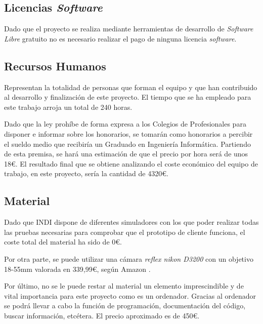 \subsection{Licencias \textit{Software}}
Dado que el proyecto se realiza mediante herramientas de desarrollo de \textit{Software Libre} gratuito no es necesario realizar el pago de ninguna licencia \textit{software}.

\subsection{Recursos Humanos}
Representan la totalidad de personas que forman el equipo y que han contribuido al desarrollo y finalización de este proyecto. El tiempo que se ha empleado para este trabajo arroja un total de 240 horas.

Dado que la ley prohíbe de forma expresa a los Colegios de Profesionales para disponer e informar sobre los honorarios, se tomarán como honorarios a percibir el sueldo medio que recibiría un Graduado en Ingeniería Informática. Partiendo de esta premisa, se hará una estimación de que el precio por hora será de unos 18\euro. El resultado final que se obtiene analizando el coste económico del equipo de trabajo, en este proyecto, sería la cantidad de 4320\euro.

\subsection{Material}
Dado que INDI dispone de diferentes simuladores con los que poder realizar todas las pruebas necesarias para comprobar que el prototipo de cliente funciona, el coste total del material ha sido de 0\euro.

Por otra parte, se puede utilizar una cámara \textit{reflex nikon D3200} con un objetivo 18-55mm valorada en 339,99\euro, según Amazon \cite{NikonAmazon}.

Por último, no se le puede restar al material un elemento imprescindible y de vital importancia para este proyecto como es un ordenador. Gracias al ordenador se podrá llevar a cabo la función de programación, documentación del código, buscar información, etcétera. El precio aproximado es de 450\euro.

